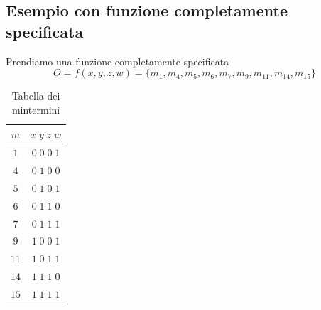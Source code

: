 \documentclass[a4paper]{article}
\theoremstyle{break}
\theoremstyle{break}
\theoremstyle{break}
\theoremstyle{break}
\begin{document}
\subsection{Esempio con funzione completamente specificata}
\begin{example}
    Prendiamo una funzione completamente specificata
   \[
       O = f(x,y,z,w) = \{ m_1, m_4, m_5, m_6, m_7, m_9, m_{11}, m_{14}, m_{15} \}
   \]  
   \begin{table}[H]
       \begin{center}
           \begin{tabular}{c|c}
               \( m \) & \( x\;y\;z\;w \)\\
               \hline
               \( 1 \) & \( 0\;0\;0\;1 \)\\ 
               \( 4 \) & \( 0\;1\;0\;0 \)\\
               \( 5 \) & \( 0\;1\;0\;1 \)\\
               \( 6 \) & \( 0\;1\;1\;0 \)\\
               \( 7 \) & \( 0\;1\;1\;1 \)\\
               \( 9 \) & \( 1\;0\;0\;1 \)\\ 
               \( 11 \) & \( 1\;0\;1\;1 \)\\
               \( 14 \) & \( 1\;1\;1\;0 \)\\
               \( 15 \) & \( 1\;1\;1\;1 \)\\
           \end{tabular}
       \end{center}
       \caption{Tabella dei mintermini}
       \label{tab:quine-mccluskey1}
   \end{table}
    

\end{example}
\end{document}
